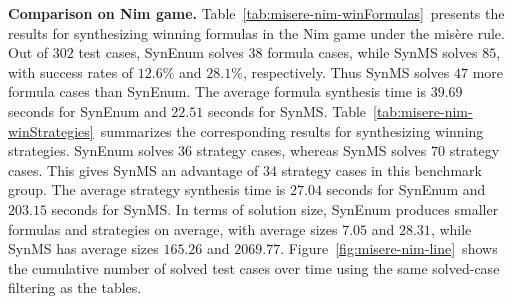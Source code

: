 \documentclass[review]{elsarticle}
\begin{document}
\textbf{Comparison on Nim game.}
Table~\ref{tab:misere-nim-winFormulas}~presents the results for synthesizing winning formulas in the Nim game under the mis\`{e}re rule.
Out of $302$ test cases, SynEnum solves $38$ formula cases, while SynMS solves $85$, with success rates of $12.6\%$ and $28.1\%$, respectively.
Thus SynMS solves $47$ more formula cases than SynEnum.
The average formula synthesis time is $39.69$ seconds for SynEnum and $22.51$ seconds for SynMS.
Table~\ref{tab:misere-nim-winStrategies}~summarizes the corresponding results for synthesizing winning strategies.
SynEnum solves $36$ strategy cases, whereas SynMS solves $70$ strategy cases.
This gives SynMS an advantage of $34$ strategy cases in this benchmark group.
The average strategy synthesis time is $27.04$ seconds for SynEnum and $203.15$ seconds for SynMS.
In terms of solution size, SynEnum produces smaller formulas and strategies on average, with average sizes $7.05$ and $28.31$, while SynMS has average sizes $165.26$ and $2069.77$.
Figure~\ref{fig:misere-nim-line}~shows the cumulative number of solved test cases over time using the same solved-case filtering as the tables.
\end{document}
